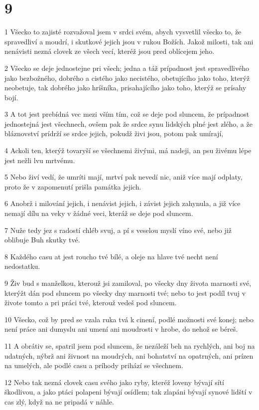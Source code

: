 \chapter{9}

\par 1 Všecko to zajisté rozvažoval jsem v srdci svém, abych vysvetlil všecko to, že spravedliví a moudrí, i skutkové jejich jsou v rukou Božích. Jakož milosti, tak ani nenávisti nezná clovek ze všech vecí, kteréž jsou pred oblícejem jeho.
\par 2 Všecko se deje jednostejne pri všech; jedna a táž prípadnost jest spravedlivého jako bezbožného, dobrého a cistého jako necistého, obetujícího jako toho, kterýž neobetuje, tak dobrého jako hríšníka, prisahajícího jako toho, kterýž se prísahy bojí.
\par 3 A tot jest prebídná vec mezi vším tím, což se deje pod sluncem, že prípadnost jednostejná jest všechnech, ovšem pak že srdce synu lidských plné jest zlého, a že bláznovství prídrží se srdce jejich, pokudž živi jsou, potom pak umírají,
\par 4 Ackoli ten, kterýž tovaryší se všechnemi živými, má nadeji, an psu živému lépe jest nežli lvu mrtvému.
\par 5 Nebo živí vedí, že umríti mají, mrtví pak nevedí nic, aniž více mají odplaty, proto že v zapomenutí prišla památka jejich.
\par 6 Anobrž i milování jejich, i nenávist jejich, i závist jejich zahynula, a již více nemají dílu na veky v žádné veci, kteráž se deje pod sluncem.
\par 7 Nuže tedy jez s radostí chléb svuj, a pí s veselou myslí víno své, nebo již oblibuje Buh skutky tvé.
\par 8 Každého casu at jest roucho tvé bílé, a oleje na hlave tvé necht není nedostatku.
\par 9 Živ bud s manželkou, kterouž jsi zamiloval, po všecky dny života marnosti své, kterýžt dán pod sluncem po všecky dny marnosti tvé; nebo to jest podíl tvuj v živote tomto a pri práci tvé, kterouž vedeš pod sluncem.
\par 10 Všecko, což by pred se vzala ruka tvá k cinení, podlé možnosti své konej; nebo není práce ani dumyslu ani umení ani moudrosti v hrobe, do nehož se béreš.
\par 11 A obrátiv se, spatril jsem pod sluncem, že nezáleží beh na rychlých, ani boj na udatných, nýbrž ani živnost na moudrých, ani bohatství na opatrných, ani prízen na umelých, ale podlé casu a príhody prihází se všechnem.
\par 12 Nebo tak nezná clovek casu svého jako ryby, kteréž loveny bývají sítí škodlivou, a jako ptáci polapeni bývají osídlem; tak zlapáni bývají synové lidští v cas zlý, když na ne pripadá v náhle.
